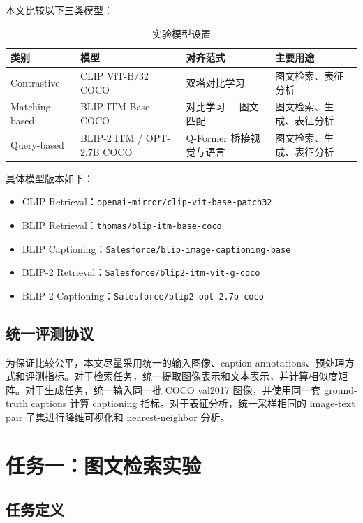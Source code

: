 \documentclass[UTF8,a4paper,10pt]{ctexart}
\begin{document}
本文比较以下三类模型：

\begin{table}[H]
    \centering
    \caption{实验模型设置}
    \begin{tabular}{llll}
        \toprule
        类别 & 模型 & 对齐范式 & 主要用途 \\
        \midrule
        Contrastive & CLIP ViT-B/32 COCO & 双塔对比学习 & 图文检索、表征分析 \\
        Matching-based & BLIP ITM Base COCO & 对比学习 + 图文匹配 & 图文检索、生成、表征分析 \\
        Query-based & BLIP-2 ITM / OPT-2.7B COCO & Q-Former 桥接视觉与语言 & 图文检索、生成、表征分析 \\
        \bottomrule
    \end{tabular}
\end{table}

具体模型版本如下：

\begin{itemize}
    \item CLIP Retrieval：\texttt{openai-mirror/clip-vit-base-patch32}
    \item BLIP Retrieval：\texttt{thomas/blip-itm-base-coco}
    \item BLIP Captioning：\texttt{Salesforce/blip-image-captioning-base}
    \item BLIP-2 Retrieval：\texttt{Salesforce/blip2-itm-vit-g-coco}
    \item BLIP-2 Captioning：\texttt{Salesforce/blip2-opt-2.7b-coco}
\end{itemize}

\subsection{统一评测协议}

为保证比较公平，本文尽量采用统一的输入图像、caption annotations、预处理方式和评测指标。对于检索任务，统一提取图像表示和文本表示，并计算相似度矩阵。对于生成任务，统一输入同一批 COCO val2017 图像，并使用同一套 ground-truth captions 计算 captioning 指标。对于表征分析，统一采样相同的 image-text pair 子集进行降维可视化和 nearest-neighbor 分析。

\section{任务一：图文检索实验}

\subsection{任务定义}
\end{document}
